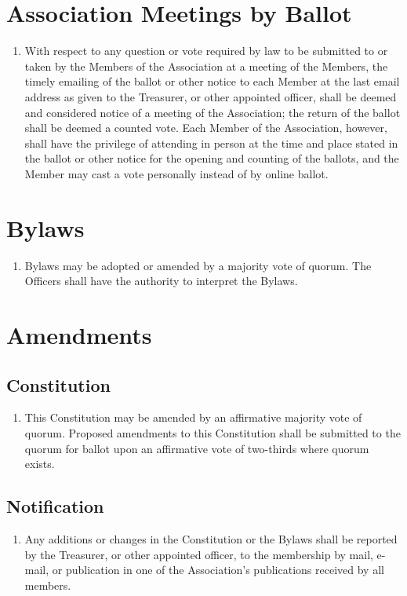 \section{Association Meetings by Ballot}
\begin{enumerate}
	\item With respect to any question or vote required by law to be submitted to or taken by the Members of the Association at a meeting of the Members, the timely emailing of the ballot or other notice to each Member at the last email address as given to the Treasurer, or other appointed officer, shall be deemed and considered notice of a meeting of the Association; the return of the ballot shall be deemed a counted vote. Each Member of the Association, however, shall have the privilege of attending in person at the time and place stated in the ballot or other notice for the opening and counting of the ballots, and the Member may cast a vote personally instead of by online ballot.
\end{enumerate}

\section{Bylaws}
\begin{enumerate}
	\item Bylaws may be adopted or amended by a majority vote of quorum. The Officers shall have the authority to interpret the Bylaws.
\end{enumerate}

\section{Amendments}

\subsection{Constitution}
\begin{enumerate}
	\item This Constitution may be amended by an affirmative majority vote of quorum. Proposed amendments to this Constitution shall be submitted to the quorum for ballot upon an affirmative vote of two-thirds where quorum exists.
\end{enumerate}

\subsection{Notification}
\begin{enumerate}
	\item Any additions or changes in the Constitution or the Bylaws shall be reported by the Treasurer, or other appointed officer, to the membership by mail, e-mail, or publication in one of the Association's publications received by all members.
\end{enumerate}

